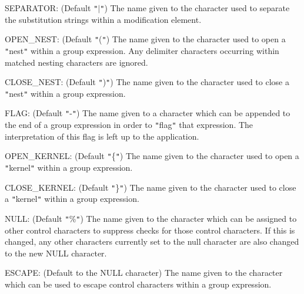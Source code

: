 {{{         \sstitem
         SEPARATOR: (Default {\tt "}$|${\tt "}) The name given to the character used
         to separate the substitution strings within a modification
         element.

         \sstitem
         OPEN\_NEST: (Default {\tt "}({\tt "}) The name given to the character used
         to open a {\tt "}nest{\tt "} within a group expression. Any delimiter
         characters occurring within matched nesting characters are ignored.

         \sstitem
         CLOSE\_NEST: (Default {\tt "}){\tt "}) The name given to the character used
         to close a {\tt "}nest{\tt "} within a group expression.

         \sstitem
         FLAG: (Default {\tt "}-{\tt "}) The name given to a character which can
         be appended to the end of a group expression in order to
         {\tt "}flag{\tt "} that expression. The interpretation of this flag is left
         up to the application.

         \sstitem
         OPEN\_KERNEL: (Default {\tt "}\{{\tt "}) The name given to the character used
         to open a {\tt "}kernel{\tt "} within a group expression.

         \sstitem
         CLOSE\_KERNEL: (Default {\tt "}\}{\tt "}) The name given to the character used
         to close a {\tt "}kernel{\tt "} within a group expression.

         \sstitem
         NULL: (Default {\tt "}\%{\tt "}) The name given to the character which can
         be assigned to other control characters to suppress checks for
         those control characters.  If this is changed, any other characters
         currently set to the null character are also changed to the new NULL
         character.

         \sstitem
         ESCAPE: (Default to the NULL character) The name given to the
         character which can be used to escape control characters within
         a group expression.
      }
   }
}
